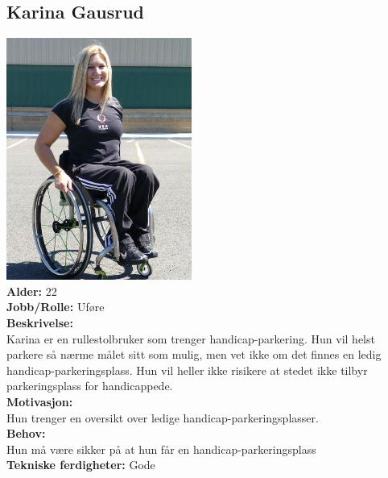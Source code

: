 \documentclass[12pt]{article}
\begin{document}
    \subsection{Karina Gausrud}
    \includegraphics[scale=1]{bilder/personaer/persona_karina.jpg}\\
    \textbf{Alder:} 22\\
    \textbf{Jobb/Rolle:} Uføre\\
    \textbf{Beskrivelse:}\\
    Karina er en rullestolbruker som trenger handicap-parkering. Hun vil helst parkere så nærme målet sitt som mulig, men vet ikke om det finnes en ledig handicap-parkeringsplass. Hun vil heller ikke risikere at stedet ikke tilbyr parkeringsplass for handicappede.\\
    \textbf{Motivasjon:}\\
    Hun trenger en oversikt over ledige handicap-parkeringsplasser.\\
    \textbf{Behov:}\\
    Hun må være sikker på at hun får en handicap-parkeringsplass\\
    \textbf{Tekniske ferdigheter:} Gode
\end{document}
